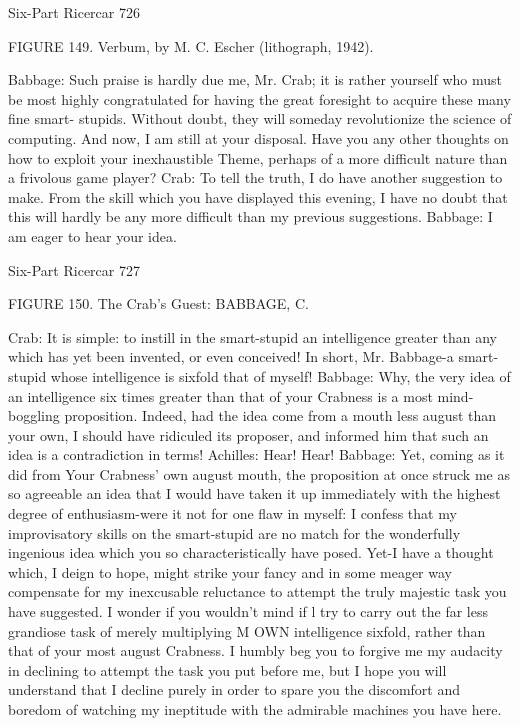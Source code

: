 Six-Part Ricercar                                                                      726

               FIGURE 149. Verbum, by M. C. Escher (lithograph, 1942).


Babbage: Such praise is hardly due me, Mr. Crab; it is rather yourself who must be most
  highly congratulated for having the great foresight to acquire these many fine smart-
  stupids. Without doubt, they will someday revolutionize the science of computing.
  And now, I am still at your disposal. Have you any other thoughts on how to exploit
  your inexhaustible Theme, perhaps of a more difficult nature than a frivolous game
  player?
Crab: To tell the truth, I do have another suggestion to make. From the skill which you
  have displayed this evening, I have no doubt that this will hardly be any more difficult
  than my previous suggestions.
Babbage: I am eager to hear your idea.




Six-Part Ricercar                                                                     727

                     FIGURE 150. The Crab's Guest: BABBAGE, C.

Crab: It is simple: to instill in the smart-stupid an intelligence greater than any which has
  yet been invented, or even conceived! In short, Mr. Babbage-a smart-stupid whose
  intelligence is sixfold that of myself!
Babbage: Why, the very idea of an intelligence six times greater than that of your
  Crabness is a most mind-boggling proposition. Indeed, had the idea come from a
  mouth less august than your own, I should have ridiculed its proposer, and informed
  him that such an idea is a contradiction in terms!
Achilles: Hear! Hear!
Babbage: Yet, coming as it did from Your Crabness' own august mouth, the proposition
  at once struck me as so agreeable an idea that I would have taken it up immediately
  with the highest degree of enthusiasm-were it not for one flaw in myself: I confess that
  my improvisatory skills on the smart-stupid are no match for the wonderfully
  ingenious idea which you so characteristically have posed. Yet-I have a thought
  which, I deign to hope, might strike your fancy and in some meager way compensate
  for my inexcusable reluctance to attempt the truly majestic task you have suggested. I
  wonder if you wouldn't mind if l try to carry out the far less grandiose task of merely
  multiplying M OWN intelligence sixfold, rather than that of your most august
  Crabness. I humbly beg you to forgive me my audacity in declining to attempt the task
  you put before me, but I hope you will understand that I decline purely in order to
  spare you the discomfort and boredom of watching my ineptitude with the admirable
  machines you have here.




